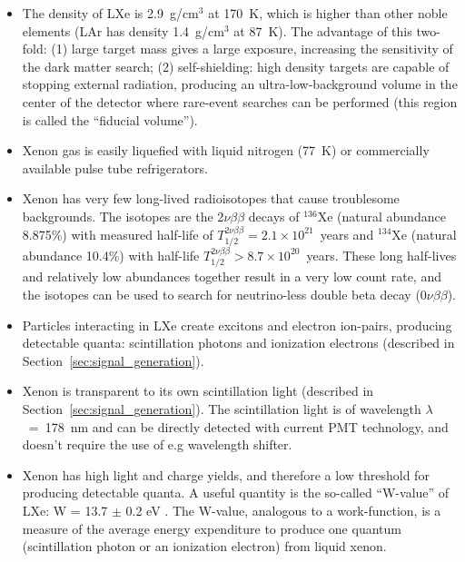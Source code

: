 \begin{itemize}

\item The density of \ac{LXe} is 2.9~g/cm$^{3}$ at 170~K, which is higher than other noble elements (\ac{LAr} has density 1.4~g/cm$^{3}$ at 87~K). The advantage of this two-fold: (1) large target mass gives a large exposure, increasing the sensitivity of the dark matter search; (2) self-shielding: high density targets are capable of stopping external radiation, producing an ultra-low-background volume in the center of the detector where rare-event searches can be performed (this region is called the ``fiducial volume'').
  
\item Xenon gas is easily liquefied with liquid nitrogen (77~K) or commercially available pulse tube refrigerators.

\item Xenon has very few long-lived radioisotopes that cause troublesome backgrounds. The isotopes are the 2$\nu\beta\beta$ decays of $^{136}$Xe (natural abundance 8.875\%) with measured half-life of $T_{1/2}^{2\nu\beta\beta} = 2.1 \times 10^{21}$~years and $^{134}$Xe (natural abundance 10.4\%) with half-life $T_{1/2}^{2\nu\beta\beta} > 8.7 \times 10^{20}$~years. These long half-lives and relatively low abundances together result in a very low count rate, and the isotopes can be used to search for neutrino-less double beta decay ($0\nu\beta\beta$).
  
\item Particles interacting in \ac{LXe} create excitons and electron ion-pairs, producing detectable quanta: scintillation photons and ionization electrons (described in Section~\ref{sec:signal_generation}).
  
\item Xenon is transparent to its own scintillation light (described in Section~\ref{sec:signal_generation}). The scintillation light is of wavelength $\lambda$~=~178~nm and can be directly detected with current \ac{PMT} technology, and doesn't require the use of e.g wavelength shifter. 

\item Xenon has high light and charge yields, and therefore a low threshold for producing detectable quanta. A useful quantity is the so-called ``W-value'' of \ac{LXe}: W = 13.7 $\pm$ 0.2 eV \cite{Dahl2009}. The W-value, analogous to a work-function, is a measure of the average energy expenditure to produce one quantum (scintillation photon or an ionization electron) from liquid xenon. 


\end{itemize}
